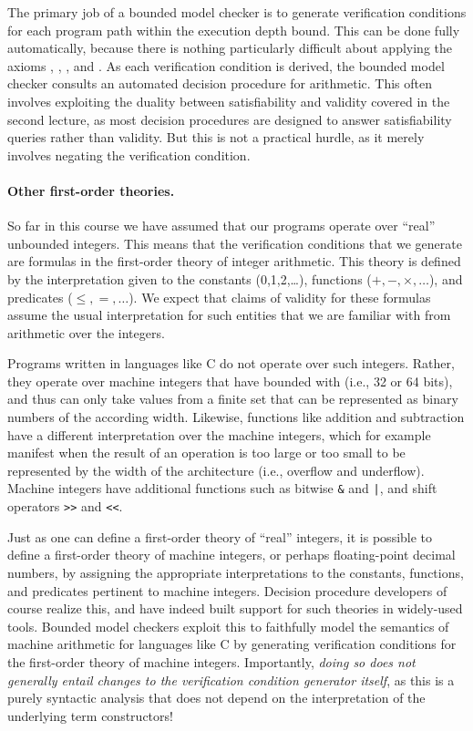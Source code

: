 \documentclass[11pt,twoside]{scrartcl}
\begin{document}
The primary job of a bounded model checker is to generate verification conditions for each program path within the execution depth bound. This can be done fully automatically, because there is nothing particularly difficult about applying the axioms , , , and . As each verification condition is derived, the bounded model checker consults an automated decision procedure for arithmetic. This often involves exploiting the duality between satisfiability and validity covered in the second lecture, as most decision procedures are designed to answer satisfiability queries rather than validity. But this is not a practical hurdle, as it merely involves negating the verification condition.

\paragraph{Other first-order theories.} So far in this course we have assumed that our programs operate over ``real'' unbounded integers. This means that the verification conditions that we generate are formulas in the first-order theory of integer arithmetic. This theory is defined by the interpretation given to the constants (0,1,2,\ldots), functions ($+,-,\times,\ldots$), and predicates ($\le,=,\ldots$). We expect that claims of validity for these formulas assume the usual interpretation for such entities that we are familiar with from arithmetic over the integers.

Programs written in languages like C do not operate over such integers. Rather, they operate over machine integers that have bounded with (i.e., 32 or 64 bits), and thus can only take values from a finite set that can be represented as binary numbers of the according width. Likewise, functions like addition and subtraction have a different interpretation over the machine integers, which for example manifest when the result of an operation is too large or too small to be represented by the width of the architecture (i.e., overflow and underflow). Machine integers have additional functions such as bitwise \verb'&' and \verb'|', and shift operators \verb'>>' and \verb'<<'.

Just as one can define a first-order theory of ``real'' integers, it is possible to define a first-order theory of machine integers, or perhaps floating-point decimal numbers, by assigning the appropriate interpretations to the constants, functions, and predicates pertinent to machine integers. Decision procedure developers of course realize this, and have indeed built support for such theories in widely-used tools. Bounded model checkers exploit this to faithfully model the semantics of machine arithmetic for languages like C by generating verification conditions for the first-order theory of machine integers. Importantly, \emph{doing so does not generally entail changes to the verification condition generator itself}, as this is a purely syntactic analysis that does not depend on the interpretation of the underlying term constructors!
\end{document}
